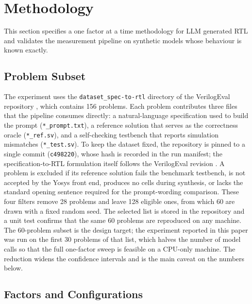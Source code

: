 \documentclass[conference]{IEEEtran}
\begin{document}
\section{Methodology}\label{sec_method}

This section specifies a one factor at a time methodology for LLM generated RTL and validates the measurement pipeline on synthetic models whose behaviour is known exactly. 

\subsection{Problem Subset}\label{sec_m_subset}

\noindent The experiment uses the \texttt{dataset\_spec-to-rtl} directory of the VerilogEval repository \cite{P12_Liu2023,P15_Pinckney2025}, which contains 156 problems. Each problem contributes three files that the pipeline consumes directly: a natural-language specification used to build the prompt (\texttt{*\_prompt.txt}), a reference solution that serves as the correctness oracle (\texttt{*\_ref.sv}), and a self-checking testbench that reports simulation mismatches (\texttt{*\_test.sv}). To keep the dataset fixed, the repository is pinned to a single commit (\texttt{c498220}), whose hash is recorded in the run manifest; the specification-to-RTL formulation itself follows the VerilogEval revision \cite{P15_Pinckney2025}. A problem is excluded if its reference solution fails the benchmark testbench, is not accepted by the Yosys front end, produces no cells during synthesis, or lacks the standard opening sentence required for the prompt-wording comparison. These four filters remove 28 problems and leave 128 eligible ones, from which 60 are drawn with a fixed random seed. The selected list is stored in the repository and a unit test confirms that the same 60 problems are reproduced on any machine. The 60-problem subset is the design target; the experiment reported in this paper was run on the first 30 problems of that list, which halves the number of model calls so that the full one-factor sweep is feasible on a CPU-only machine. The reduction widens the confidence intervals and is the main caveat on the numbers below.

\subsection{Factors and Configurations}\label{sec_m_factors}
\end{document}

